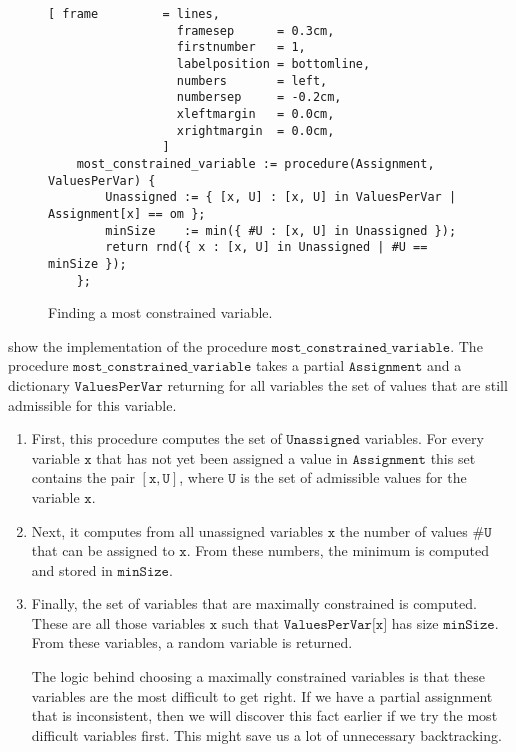 \begin{figure}[!ht]
\centering
\begin{Verbatim}[ frame         = lines, 
                  framesep      = 0.3cm, 
                  firstnumber   = 1,
                  labelposition = bottomline,
                  numbers       = left,
                  numbersep     = -0.2cm,
                  xleftmargin   = 0.0cm,
                  xrightmargin  = 0.0cm,
                ]
    most_constrained_variable := procedure(Assignment, ValuesPerVar) {
        Unassigned := { [x, U] : [x, U] in ValuesPerVar | Assignment[x] == om };
        minSize    := min({ #U : [x, U] in Unassigned });
        return rnd({ x : [x, U] in Unassigned | #U == minSize });
    };
\end{Verbatim}
\vspace*{-0.3cm}
\caption{Finding a most constrained variable.}
\label{fig:csp-constraint-propagation.stlx-2}
\end{figure}
 show the implementation of the procedure
$\texttt{most\_constrained\_variable}$.  The procedure $\texttt{most\_constrained\_variable}$ takes a partial 
$\texttt{Assignment}$ and a dictionary $\texttt{ValuesPerVar}$ returning for all variables the set of values
that are still admissible for this variable.
\begin{enumerate}
\item First, this procedure computes the set of $\texttt{Unassigned}$ variables.  For every variable $\texttt{x}$ that
      has not yet been assigned a value in $\texttt{Assignment}$ this set contains the pair 
      $[\texttt{x}, \texttt{U}]$, where $\texttt{U}$ is the set of admissible values for the variable  $\texttt{x}$.
\item Next, it computes from all unassigned variables $\texttt{x}$ the number of values $\texttt{\#U}$ 
      that can be assigned to $\texttt{x}$.  From these numbers, the minimum is computed and stored in $\texttt{minSize}$.  
\item Finally, the set of variables that are maximally constrained is computed.  These are all those variables
      $\texttt{x}$ such that $\texttt{ValuesPerVar[x]}$ has size $\texttt{minSize}$.  From these variables, a random 
      variable is returned.
      
      The logic behind choosing a maximally constrained variables is that these variables are the most
      difficult to get right.  If we have a partial assignment that is inconsistent, then we will discover this
      fact earlier if we try the most difficult variables first.  This might save us a lot of unnecessary
      backtracking. 
\end{enumerate}

